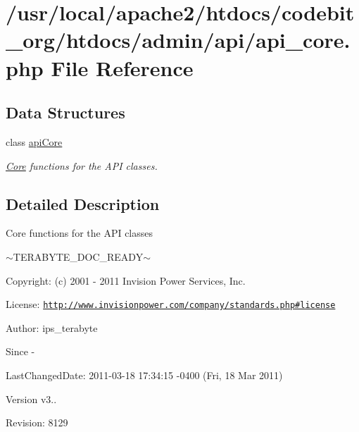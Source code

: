 \hypertarget{api__core_8php}{\section{/usr/local/apache2/htdocs/codebit\-\_\-org/htdocs/admin/api/api\-\_\-core.php File Reference}
\label{api__core_8php}
}
\subsection*{Data Structures}
\begin{DoxyCompactItemize}
\item 
class \hyperlink{classapi_core}{api\-Core}
\begin{DoxyCompactList}\small\item\em \hyperlink{namespace_core}{Core} functions for the A\-P\-I classes. \end{DoxyCompactList}\end{DoxyCompactItemize}


\subsection{Detailed Description}
\begin{DoxyVerb}  Core functions for the API classes
\end{DoxyVerb}
 $\sim$\-T\-E\-R\-A\-B\-Y\-T\-E\-\_\-\-D\-O\-C\-\_\-\-R\-E\-A\-D\-Y$\sim$ \begin{DoxyParagraph}{Copyright\-:}
(c) 2001 -\/ 2011 Invision Power Services, Inc.
\end{DoxyParagraph}
\begin{DoxyParagraph}{License\-:}
\href{http://www.invisionpower.com/company/standards.php#license}{\tt http\-://www.\-invisionpower.\-com/company/standards.\-php\#license}
\end{DoxyParagraph}
\begin{DoxyParagraph}{Author\-:}
ips\-\_\-terabyte 
\end{DoxyParagraph}
\begin{DoxySince}{Since}
-\/ 
\end{DoxySince}
\begin{DoxyParagraph}{Last\-Changed\-Date\-:}
2011-\/03-\/18 17\-:34\-:15 -\/0400 (Fri, 18 Mar 2011) 
\end{DoxyParagraph}
\begin{DoxyVersion}{Version}
v3.. 
\end{DoxyVersion}
\begin{DoxyParagraph}{Revision\-:}
8129 
\end{DoxyParagraph}
